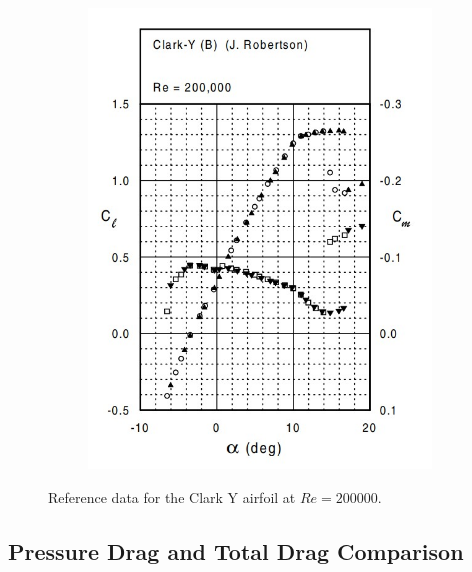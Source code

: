 \documentclass[runningheads]{llncs}
\begin{document}
\begin{figure}[h]
\begin{subfigure}[b]{0.45\textwidth}
         \includegraphics[width=\textwidth]{figures/clark_y_reference_cl_cm.jpg}
         \caption{}
         \label{fig:reference_cl_cm}
     \end{subfigure}
    \caption{Reference data for the Clark Y airfoil at $Re = 200000$.}
    \label{fig:clark_y_reference}
\end{figure}

\subsection{Pressure Drag and Total Drag Comparison}
\end{document}

